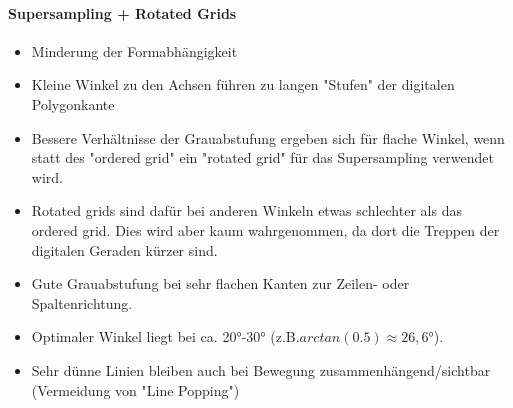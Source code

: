 \documentclass[10pt,landscape]{article}
\begin{document}
\begin{multicols}{3}
  \paragraph{Supersampling + Rotated Grids}
  \begin{itemize}
    \item Minderung der Formabhängigkeit
    \item Kleine Winkel zu den Achsen führen zu langen "Stufen" der digitalen Polygonkante
    \item Bessere Verhältnisse der Grauabstufung ergeben sich für flache Winkel, wenn statt des "ordered grid" ein "rotated grid" für das Supersampling verwendet wird.
    \item Rotated grids sind dafür bei anderen Winkeln etwas schlechter als das ordered grid. Dies wird aber kaum wahrgenommen, da dort die Treppen der digitalen Geraden kürzer sind.
    \item Gute Grauabstufung bei sehr flachen Kanten zur Zeilen- oder Spaltenrichtung.
    \item Optimaler Winkel liegt bei ca. 20°-30° (z.B.$arctan(0.5) \approx 26,6°$).
    \item Sehr dünne Linien bleiben auch bei Bewegung zusammenhängend/sichtbar (Vermeidung von "Line Popping")
  \end{itemize}

\end{multicols}
\end{document}

